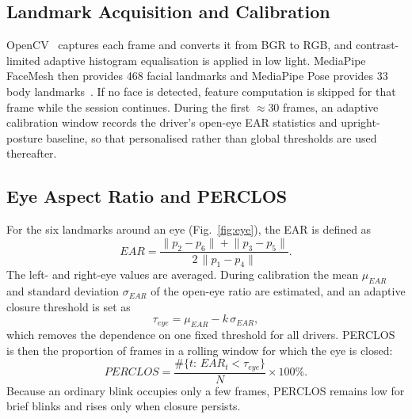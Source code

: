 \documentclass[conference]{IEEEtran}
\begin{document}
\subsection{Landmark Acquisition and Calibration}
OpenCV~\cite{bradski} captures each frame and converts it from BGR to RGB, and contrast-limited adaptive histogram equalisation is applied in low light. MediaPipe FaceMesh then provides 468 facial landmarks and MediaPipe Pose provides 33 body landmarks~\cite{lugaresi,bazarevsky}. If no face is detected, feature computation is skipped for that frame while the session continues. During the first $\approx$30 frames, an adaptive calibration window records the driver's open-eye EAR statistics and upright-posture baseline, so that personalised rather than global thresholds are used thereafter.

\subsection{Eye Aspect Ratio and PERCLOS}
For the six landmarks around an eye (Fig.~\ref{fig:eye}), the EAR is defined as
\begin{equation}
EAR = \frac{\lVert p_2-p_6\rVert+\lVert p_3-p_5\rVert}{2\,\lVert p_1-p_4\rVert}.
\end{equation}
The left- and right-eye values are averaged. During calibration the mean $\mu_{EAR}$ and standard deviation $\sigma_{EAR}$ of the open-eye ratio are estimated, and an adaptive closure threshold is set as
\begin{equation}
\tau_{eye}=\mu_{EAR}-k\,\sigma_{EAR},
\end{equation}
which removes the dependence on one fixed threshold for all drivers. PERCLOS is then the proportion of frames in a rolling window for which the eye is closed:
\begin{equation}
PERCLOS=\frac{\#\{t:\,EAR_t<\tau_{eye}\}}{N}\times100\%.
\end{equation}
Because an ordinary blink occupies only a few frames, PERCLOS remains low for brief blinks and rises only when closure persists.
\end{document}
